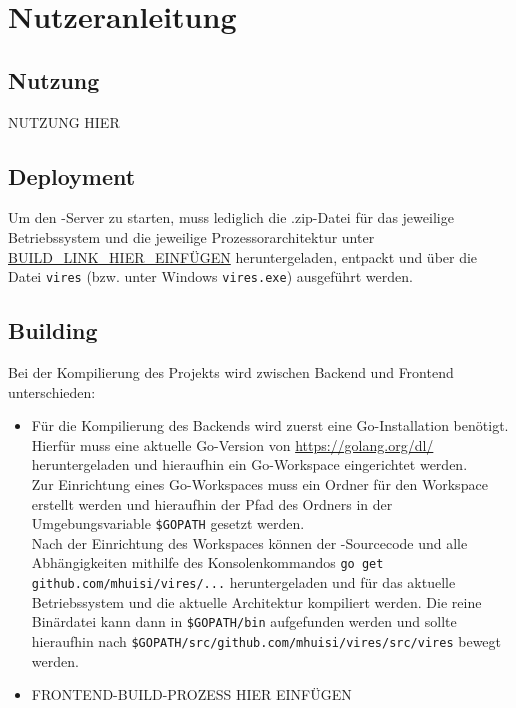 \section{Nutzeranleitung}
\subsection{Nutzung}
NUTZUNG HIER

\subsection{Deployment}
Um den \vires-Server zu starten, muss lediglich die .zip-Datei für das jeweilige Betriebssystem und die jeweilige Prozessorarchitektur unter 
\url{BUILD_LINK_HIER_EINFÜGEN} heruntergeladen, entpackt und über die Datei \verb+vires+ (bzw. unter Windows \verb+vires.exe+) ausgeführt werden.

\subsection{Building}
Bei der Kompilierung des Projekts wird zwischen Backend und Frontend unterschieden:
\begin{itemize}
	\item Für die Kompilierung des Backends wird zuerst eine Go-Installation benötigt.\\
	Hierfür muss eine aktuelle Go-Version von \url{https://golang.org/dl/} heruntergeladen und hieraufhin ein Go-Workspace eingerichtet werden.\\
	Zur Einrichtung eines Go-Workspaces muss ein Ordner für den Workspace erstellt werden und hieraufhin der Pfad des Ordners in der Umgebungsvariable 
	\verb+$GOPATH+ gesetzt werden.\\
	Nach der Einrichtung des Workspaces können der \vires-Sourcecode und alle Abhängigkeiten mithilfe des Konsolenkommandos
	\verb+go get github.com/mhuisi/vires/...+ heruntergeladen und für das aktuelle Betriebssystem und die aktuelle Architektur kompiliert werden. 
	Die reine Binärdatei kann dann in \verb+$GOPATH/bin+ aufgefunden werden und sollte hieraufhin nach
	\verb+$GOPATH/src/github.com/mhuisi/vires/src/vires+ bewegt werden.
	\item FRONTEND-BUILD-PROZESS HIER EINFÜGEN
\end{itemize}
